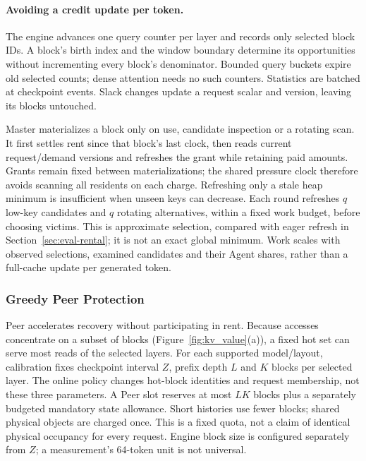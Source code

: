 \paragraph{Avoiding a credit update per token.}
The engine advances one query counter per layer and records only selected
block IDs. A block's birth index and the window boundary determine its
opportunities without incrementing every block's denominator. Bounded
query buckets expire old selected counts; dense attention needs no such
counters. Statistics are batched at checkpoint events. Slack changes
update a request scalar and version, leaving its blocks untouched.

Master materializes a block only on use, candidate inspection or a
rotating scan. It first settles rent since that block's last clock,
then reads current request/demand versions and refreshes the grant while
retaining paid amounts. Grants remain fixed between materializations;
the shared pressure clock therefore avoids scanning all residents on
each charge. Refreshing only a stale heap minimum is insufficient when
unseen keys can decrease. Each round refreshes $q$ low-key candidates
and $q$ rotating alternatives, within a fixed work budget, before choosing
victims. This is approximate selection, compared with eager refresh in
Section~\ref{sec:eval-rental}; it is not an exact global minimum. Work
scales with observed selections, examined candidates and their Agent
shares, rather than a full-cache update per generated token.

\subsubsection{Greedy Peer Protection}
\label{sec:sparse-placement}

Peer accelerates recovery without participating in rent. Because accesses
concentrate on a subset of blocks (Figure~\ref{fig:kv_value}(a)), a
fixed hot set can serve most reads of the selected layers. For each supported
model/layout, calibration fixes checkpoint interval $Z$, prefix depth $L$
and $K$ blocks per selected layer. The online policy changes hot-block
identities and request membership, not these three parameters. A Peer
slot reserves at most $LK$ blocks plus a separately budgeted mandatory
state allowance. Short histories use fewer blocks; shared physical
objects are charged once. This is a fixed quota, not a claim of identical
physical occupancy for every request. Engine block size is configured
separately from $Z$; a measurement's 64-token unit is not universal.

